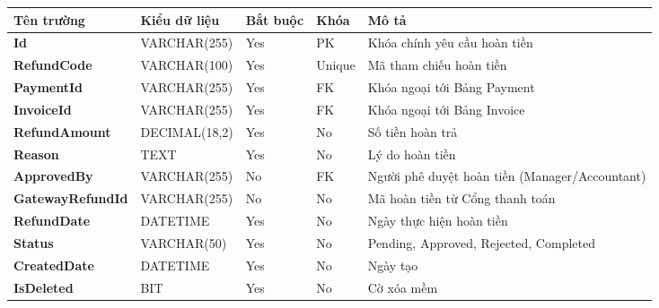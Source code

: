 \documentclass[11pt,a4paper]{article}
\begin{document}
	\begin{tabularx}{\textwidth}{|>{\bfseries}p{3.5cm}|p{2.5cm}|p{1.5cm}|p{1.8cm}|X|}
		\hline
		\rowcolor{tablehead} Tên trường & Kiểu dữ liệu & Bắt buộc & Khóa & Mô tả \\ \hline
		Id & VARCHAR(255) & Yes & PK & Khóa chính yêu cầu hoàn tiền \\ \hline
		RefundCode & VARCHAR(100) & Yes & Unique & Mã tham chiếu hoàn tiền \\ \hline
		PaymentId & VARCHAR(255) & Yes & FK & Khóa ngoại tới Bảng Payment \\ \hline
		InvoiceId & VARCHAR(255) & Yes & FK & Khóa ngoại tới Bảng Invoice \\ \hline
		RefundAmount & DECIMAL(18,2) & Yes & No & Số tiền hoàn trả \\ \hline
		Reason & TEXT & Yes & No & Lý do hoàn tiền \\ \hline
		ApprovedBy & VARCHAR(255) & No & FK & Người phê duyệt hoàn tiền (Manager/Accountant) \\ \hline
		GatewayRefundId & VARCHAR(255) & No & No & Mã hoàn tiền từ Cổng thanh toán \\ \hline
		RefundDate & DATETIME & Yes & No & Ngày thực hiện hoàn tiền \\ \hline
		Status & VARCHAR(50) & Yes & No & Pending, Approved, Rejected, Completed \\ \hline
		CreatedDate & DATETIME & Yes & No & Ngày tạo \\ \hline
		IsDeleted & BIT & Yes & No & Cờ xóa mềm \\ \hline
	\end{tabularx}
	
\end{document}

